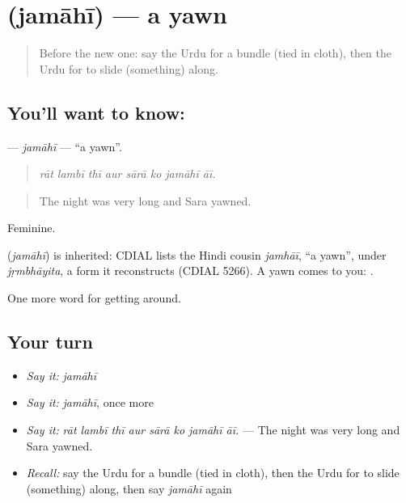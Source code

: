 \section[\texorpdfstring{\ur{جماہی} (jamāhī)}{جماہی (jamāhī)}]{ (jamāhī) — a yawn}

\label{lesson:UR-C389-jamahi}



\begin{quote}
Before the new one: say the Urdu for a bundle (tied in cloth), then the Urdu for to slide (something) along.
\end{quote}

\subsection*{You'll want to know: }
\textbf{} — \emph{jamāhī} — \textquotedblleft{}a yawn\textquotedblright{}.

\begin{quote}
       
\end{quote}

\begin{quote}
\emph{rāt lambī thī aur sārā ko jamāhī āī.}
\end{quote}

\begin{quote}
The night was very long and Sara yawned.
\end{quote}

Feminine.

\begin{cousinweb}
\textbf{} (\emph{jamāhī}) is inherited: CDIAL lists the Hindi cousin \emph{jamhāī}, \textquotedblleft{}a yawn\textquotedblright{}, under \emph{jṛmbhāyita}, a form it reconstructs (CDIAL 5266). A yawn comes to you: \textbf{   }.
\end{cousinweb}

\begin{grammarlens}[title={What you've built}]
One more word for getting around.
\end{grammarlens}

\subsection*{Your turn}
\begin{itemize}
\raggedright
  \item \emph{Say it:} \emph{jamāhī}
  \item \emph{Say it:} \emph{jamāhī}, once more
  \item \emph{Say it:} \emph{rāt lambī thī aur sārā ko jamāhī āī.} — The night was very long and Sara yawned.
  \item \emph{Recall:} say the Urdu for a bundle (tied in cloth), then the Urdu for to slide (something) along, then say \emph{jamāhī} again
\end{itemize}

